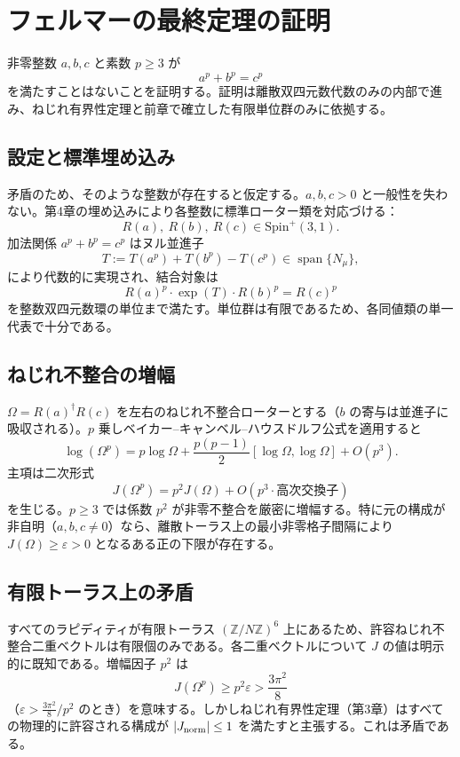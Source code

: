 \documentclass[dvipdfmx,a4paper]{article}
\theoremstyle{definition}
\theoremstyle{remark}
\newcommand{\Jnorm}{J_{\rm norm}}
\newcommand{\Jbound}{\frac{3\pi^2}{8}}
\begin{document}
\section{フェルマーの最終定理の証明}

非零整数 $a, b, c$ と素数 $p \geq 3$ が
\[
a^p + b^p = c^p
\]
を満たすことはないことを証明する。証明は離散双四元数代数のみの内部で進み、ねじれ有界性定理と前章で確立した有限単位群のみに依拠する。

\subsection{設定と標準埋め込み}

矛盾のため、そのような整数が存在すると仮定する。$a, b, c > 0$ と一般性を失わない。第4章の埋め込みにより各整数に標準ローター類を対応づける：
\[
R(a),\ R(b),\ R(c) \in \mathrm{Spin}^+(3,1).
\]
加法関係 $a^p + b^p = c^p$ はヌル並進子
\[
T := T(a^p) + T(b^p) - T(c^p) \in \operatorname{span}\{N_\mu\},
\]
により代数的に実現され、結合対象は
\[
R(a)^p \cdot \exp(T) \cdot R(b)^p = R(c)^p
\]
を整数双四元数環の単位まで満たす。単位群は有限であるため、各同値類の単一代表で十分である。

\subsection{ねじれ不整合の増幅}

$\Omega = R(a)^\dagger R(c)$ を左右のねじれ不整合ローターとする（$b$ の寄与は並進子に吸収される）。$p$ 乗しベイカー--キャンベル--ハウスドルフ公式を適用すると
\[
\log(\Omega^p) = p \log \Omega + \frac{p(p-1)}{2} [\log \Omega, \log \Omega] + O(p^3).
\]
主項は二次形式
\[
J(\Omega^p) = p^2 J(\Omega) + O(p^3 \cdot \text{高次交換子})
\]
を生じる。$p \geq 3$ では係数 $p^2$ が非零不整合を厳密に増幅する。特に元の構成が非自明（$a,b,c \neq 0$）なら、離散トーラス上の最小非零格子間隔により $J(\Omega) \geq \varepsilon > 0$ となるある正の下限が存在する。

\subsection{有限トーラス上の矛盾}

すべてのラピディティが有限トーラス $(\mathbb{Z}/N\mathbb{Z})^6$ 上にあるため、許容ねじれ不整合二重ベクトルは有限個のみである。各二重ベクトルについて $J$ の値は明示的に既知である。増幅因子 $p^2$ は
\[
J(\Omega^p) \geq p^2 \varepsilon > \Jbound
\]
（$\varepsilon > \Jbound/p^2$ のとき）を意味する。しかしねじれ有界性定理（第3章）はすべての物理的に許容される構成が $|\Jnorm| \leq 1$ を満たすと主張する。これは矛盾である。
\end{document}
